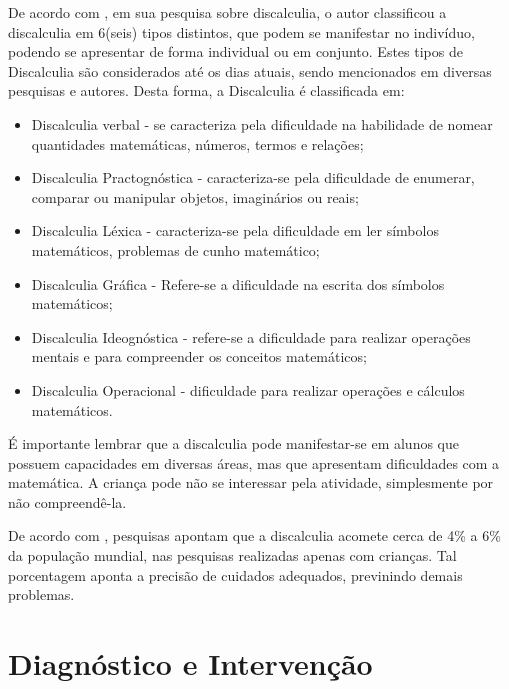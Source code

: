 \documentclass[
	12pt,				%
    oneside,			%
	a4paper,			%
	english,			%
	french,				%
	spanish,			%
	brazil,				%
	]{abntex2}
\begin{document}
De acordo com , em sua pesquisa sobre discalculia, o autor classificou a discalculia em 6(seis) tipos distintos, que podem se manifestar no indivíduo, podendo se apresentar de forma individual ou em conjunto. Estes tipos de Discalculia são considerados até os dias atuais, sendo mencionados em diversas pesquisas e autores. Desta forma, a Discalculia é classificada em:

\begin{itemize}
    \item Discalculia verbal - se caracteriza pela dificuldade na habilidade de nomear quantidades matemáticas, números, termos e relações;
    
    \item Discalculia Practognóstica - caracteriza-se pela dificuldade de enumerar, comparar ou manipular objetos, imaginários ou reais;
    
    \item Discalculia Léxica - caracteriza-se pela dificuldade em ler símbolos matemáticos, problemas de cunho matemático;
    
    \item Discalculia Gráfica - Refere-se a dificuldade na escrita dos símbolos matemáticos;
    
    \item Discalculia Ideognóstica - refere-se a dificuldade para realizar operações mentais e para compreender os conceitos matemáticos;
    
    \item Discalculia Operacional - dificuldade para realizar operações e cálculos matemáticos.
    
\end{itemize}

É importante lembrar que a discalculia pode manifestar-se em alunos que possuem capacidades em diversas áreas, mas que apresentam dificuldades com a matemática. A criança pode não se interessar pela atividade, simplesmente por não compreendê-la.

De acordo com , pesquisas apontam que a discalculia acomete cerca de 4\% a 6\% da população mundial, nas pesquisas realizadas apenas com crianças. Tal porcentagem aponta a precisão de cuidados adequados, previnindo demais problemas.

\section{Diagnóstico e Intervenção}
\end{document}
